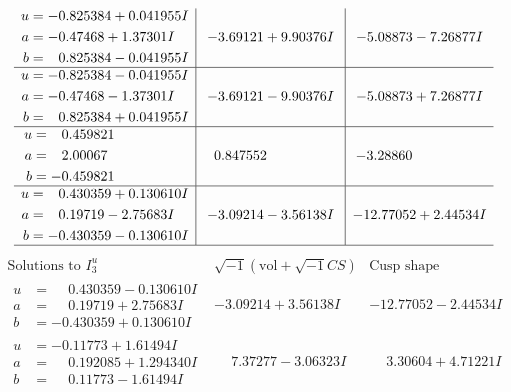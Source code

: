 \documentclass[1p]{elsarticle_modified}
\theoremstyle{definition}
\newcommand{\I}{\sqrt{-1}}
\begin{document}
$$\begin{array}{c|c|c}
\begin{aligned}
u &= -0.825384 + 0.041955 I \\
a &= -0.47468 + 1.37301 I \\
b &= \phantom{-}0.825384 - 0.041955 I\end{aligned}
 & -3.69121 + 9.90376 I & -5.08873 - 7.26877 I \\ \hline\begin{aligned}
u &= -0.825384 - 0.041955 I \\
a &= -0.47468 - 1.37301 I \\
b &= \phantom{-}0.825384 + 0.041955 I\end{aligned}
 & -3.69121 - 9.90376 I & -5.08873 + 7.26877 I \\ \hline\begin{aligned}
u &= \phantom{-}0.459821\phantom{ +0.000000I} \\
a &= \phantom{-}2.00067\phantom{ +0.000000I} \\
b &= -0.459821\phantom{ +0.000000I}\end{aligned}
 & \phantom{-}0.847552\phantom{ +0.000000I} & -3.28860\phantom{ +0.000000I} \\ \hline\begin{aligned}
u &= \phantom{-}0.430359 + 0.130610 I \\
a &= \phantom{-}0.19719 - 2.75683 I \\
b &= -0.430359 - 0.130610 I\end{aligned}
 & -3.09214 - 3.56138 I & -12.77052 + 2.44534 I\\
 \hline 
 \end{array}$$\newpage$$\begin{array}{c|c|c}  
\text{Solutions to }I^u_{3}& \I (\text{vol} + \sqrt{-1}CS) & \text{Cusp shape}\\
 \hline 
\begin{aligned}
u &= \phantom{-}0.430359 - 0.130610 I \\
a &= \phantom{-}0.19719 + 2.75683 I \\
b &= -0.430359 + 0.130610 I\end{aligned}
 & -3.09214 + 3.56138 I & -12.77052 - 2.44534 I \\ \hline\begin{aligned}
u &= -0.11773 + 1.61494 I \\
a &= \phantom{-}0.192085 + 1.294340 I \\
b &= \phantom{-}0.11773 - 1.61494 I\end{aligned}
 & \phantom{-}7.37277 - 3.06323 I & \phantom{-}3.30604 + 4.71221 I \\ \hline\begin{aligned}

\end{aligned}
\end{array}$$
\end{document}
